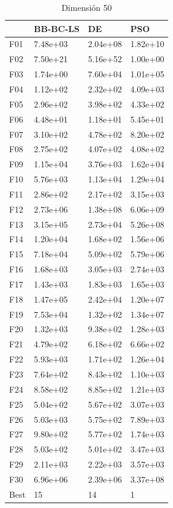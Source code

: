 \begin{table}[H]
    \begin{minipage}{.5\linewidth}
      \caption{Dimensión 50}
      \centering
      \begin{tabular}{llll}
        \toprule
        {} &  BB-BC-LS &        DE &       PSO \\
        \midrule
        F01  &  7.48e+03 &  2.04e+08 &  1.82e+10 \\
        F02  &  7.50e+21 &  5.16e+52 &  1.00e+00 \\
        F03  &  1.74e+00 &  7.60e+04 &  1.01e+05 \\
        F04  &  1.12e+02 &  2.32e+02 &  4.09e+03 \\
        F05  &  2.96e+02 &  3.98e+02 &  4.33e+02 \\
        F06  &  4.48e+01 &  1.18e+01 &  5.45e+01 \\
        F07  &  3.10e+02 &  4.78e+02 &  8.20e+02 \\
        F08  &  2.75e+02 &  4.07e+02 &  4.08e+02 \\
        F09  &  1.15e+04 &  3.76e+03 &  1.62e+04 \\
        F10  &  5.76e+03 &  1.13e+04 &  1.29e+04 \\
        F11  &  2.86e+02 &  2.17e+02 &  3.15e+03 \\
        F12  &  2.73e+06 &  1.38e+08 &  6.06e+09 \\
        F13  &  3.15e+05 &  2.73e+04 &  5.26e+08 \\
        F14  &  1.20e+04 &  1.68e+02 &  1.56e+06 \\
        F15  &  7.18e+04 &  5.09e+02 &  5.79e+06 \\
        F16  &  1.68e+03 &  3.05e+03 &  2.74e+03 \\
        F17  &  1.43e+03 &  1.83e+03 &  1.65e+03 \\
        F18  &  1.47e+05 &  2.42e+04 &  1.20e+07 \\
        F19  &  7.53e+04 &  1.32e+02 &  1.34e+07 \\
        F20  &  1.32e+03 &  9.38e+02 &  1.28e+03 \\
        F21  &  4.79e+02 &  6.18e+02 &  6.66e+02 \\
        F22  &  5.93e+03 &  1.71e+02 &  1.26e+04 \\
        F23  &  7.64e+02 &  8.43e+02 &  1.10e+03 \\
        F24  &  8.58e+02 &  8.85e+02 &  1.21e+03 \\
        F25  &  5.04e+02 &  5.67e+02 &  3.07e+03 \\
        F26  &  5.03e+03 &  5.75e+02 &  7.89e+03 \\
        F27  &  9.80e+02 &  5.77e+02 &  1.74e+03 \\
        F28  &  5.03e+02 &  5.01e+02 &  3.47e+03 \\
        F29  &  2.11e+03 &  2.22e+03 &  3.57e+03 \\
        F30  &  6.96e+06 &  2.39e+06 &  3.37e+08 \\
        Best &        15 &        14 &         1 \\
        \bottomrule
        \end{tabular}
        

\end{minipage}
\end{table}
